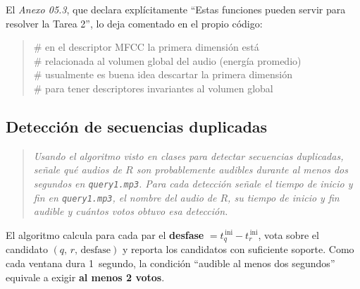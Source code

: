 \documentclass[11pt, a4paper]{article}
\newcommand{\code}[1]{\texttt{#1}}
\newenvironment{enunciado}
  {\begin{quote}\itshape\color{black!75}\small}
  {\end{quote}}
\begin{document}
El \textit{Anexo 05.3}, que declara explícitamente ``Estas funciones pueden servir para resolver la
Tarea 2'', lo deja comentado en el propio código:

\begin{quote}\small\ttfamily
\# en el descriptor MFCC la primera dimensión está\\
\# relacionada al volumen global del audio (energía promedio)\\
\# usualmente es buena idea descartar la primera dimensión\\
\# para tener descriptores invariantes al volumen global
\end{quote}

\subsection{Detección de secuencias duplicadas}

\begin{enunciado}
Usando el algoritmo visto en clases para detectar secuencias duplicadas, señale qué audios de $R$ son
probablemente audibles durante al menos dos segundos en \code{query1.mp3}. Para cada detección señale
el tiempo de inicio y fin en \code{query1.mp3}, el nombre del audio de $R$, su tiempo de inicio y fin
audible y cuántos votos obtuvo esa detección.
\end{enunciado}

El algoritmo calcula para cada par el \textbf{desfase} $= t_q^{\,\text{ini}} - t_r^{\,\text{ini}}$,
vota sobre el candidato $(q,\,r,\,\text{desfase})$ y reporta los candidatos con suficiente soporte.
Como cada ventana dura 1~segundo, la condición ``audible al menos dos segundos'' equivale a exigir
\textbf{al menos 2 votos}.
\end{document}
